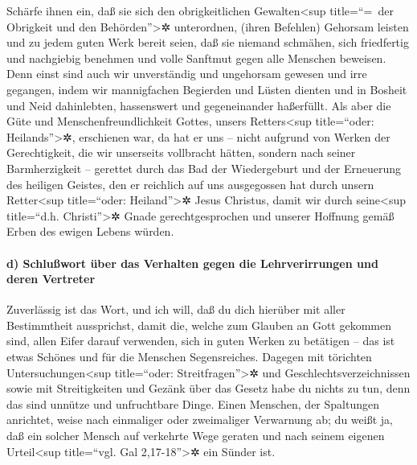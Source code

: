  Schärfe ihnen ein, daß sie sich den obrigkeitlichen
Gewalten\textless sup title=``=~der Obrigkeit und den
Behörden''\textgreater✲ unterordnen, (ihren Befehlen) Gehorsam leisten
und zu jedem guten Werk bereit seien,  daß sie niemand
schmähen, sich friedfertig und nachgiebig benehmen und volle Sanftmut
gegen alle Menschen beweisen.  Denn einst sind auch wir
unverständig und ungehorsam gewesen und irre gegangen, indem wir
mannigfachen Begierden und Lüsten dienten und in Bosheit und Neid
dahinlebten, hassenswert und gegeneinander haßerfüllt. 
Als aber die Güte und Menschenfreundlichkeit Gottes, unsers
Retters\textless sup title=``oder: Heilands''\textgreater✲, erschienen
war,  da hat er uns -- nicht aufgrund von Werken der
Gerechtigkeit, die wir unserseits vollbracht hätten, sondern nach seiner
Barmherzigkeit -- gerettet durch das Bad der Wiedergeburt und der
Erneuerung des heiligen Geistes,  den er reichlich auf uns
ausgegossen hat durch unsern Retter\textless sup title=``oder:
Heiland''\textgreater✲ Jesus Christus,  damit wir durch
seine\textless sup title=``d.h. Christi''\textgreater✲ Gnade
gerechtgesprochen und unserer Hoffnung gemäß Erben des ewigen Lebens
würden.

\hypertarget{d-schluuxdfwort-uxfcber-das-verhalten-gegen-die-lehrverirrungen-und-deren-vertreter}{%
\paragraph{d) Schlußwort über das Verhalten gegen die Lehrverirrungen
und deren
Vertreter}\label{d-schluuxdfwort-uxfcber-das-verhalten-gegen-die-lehrverirrungen-und-deren-vertreter}}

 Zuverlässig ist das Wort, und ich will, daß du dich
hierüber mit aller Bestimmtheit aussprichst, damit die, welche zum
Glauben an Gott gekommen sind, allen Eifer darauf verwenden, sich in
guten Werken zu betätigen -- das ist etwas Schönes und für die Menschen
Segensreiches.  Dagegen mit törichten
Untersuchungen\textless sup title=``oder: Streitfragen''\textgreater✲
und Geschlechtsverzeichnissen sowie mit Streitigkeiten und Gezänk über
das Gesetz habe du nichts zu tun, denn das sind unnütze und unfruchtbare
Dinge.  Einen Menschen, der Spaltungen anrichtet, weise
nach einmaliger oder zweimaliger Verwarnung ab;  du weißt
ja, daß ein solcher Mensch auf verkehrte Wege geraten und nach seinem
eigenen Urteil\textless sup title=``vgl. Gal 2,17-18''\textgreater✲ ein
Sünder ist.

